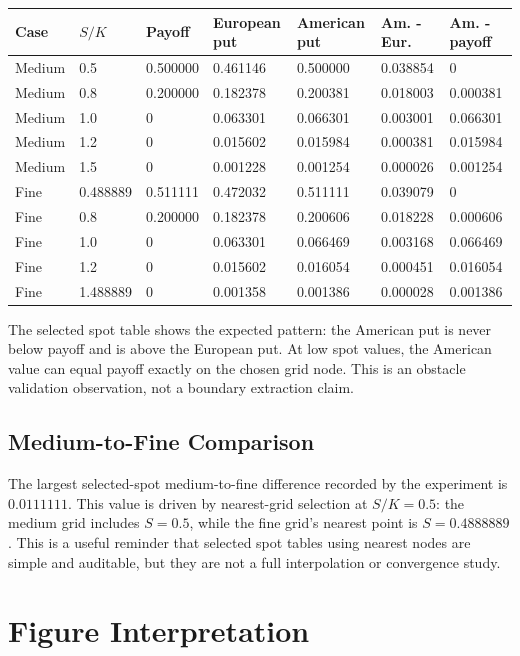 \documentclass[11pt,a4paper]{article}
\begin{document}
{\footnotesize
\begin{longtable}{@{}L{0.10\textwidth}L{0.10\textwidth}L{0.12\textwidth}L{0.13\textwidth}L{0.13\textwidth}L{0.13\textwidth}L{0.13\textwidth}@{}}
\toprule
Case & \(S/K\) & Payoff & European put & American put & Am. - Eur. & Am. - payoff \\
\midrule
\endhead
Medium & 0.5 & 0.500000 & 0.461146 & 0.500000 & 0.038854 & 0 \\
Medium & 0.8 & 0.200000 & 0.182378 & 0.200381 & 0.018003 & 0.000381 \\
Medium & 1.0 & 0 & 0.063301 & 0.066301 & 0.003001 & 0.066301 \\
Medium & 1.2 & 0 & 0.015602 & 0.015984 & 0.000381 & 0.015984 \\
Medium & 1.5 & 0 & 0.001228 & 0.001254 & 0.000026 & 0.001254 \\
Fine & 0.488889 & 0.511111 & 0.472032 & 0.511111 & 0.039079 & 0 \\
Fine & 0.8 & 0.200000 & 0.182378 & 0.200606 & 0.018228 & 0.000606 \\
Fine & 1.0 & 0 & 0.063301 & 0.066469 & 0.003168 & 0.066469 \\
Fine & 1.2 & 0 & 0.015602 & 0.016054 & 0.000451 & 0.016054 \\
Fine & 1.488889 & 0 & 0.001358 & 0.001386 & 0.000028 & 0.001386 \\
\bottomrule
\end{longtable}
}

The selected spot table shows the expected pattern: the American put is never below payoff and is
above the European put. At low spot values, the American value can equal payoff exactly on the
chosen grid node. This is an obstacle validation observation, not a boundary extraction claim.

\subsection{Medium-to-Fine Comparison}

The largest selected-spot medium-to-fine difference recorded by the experiment is \(0.0111111\).
This value is driven by nearest-grid selection at \(S/K=0.5\): the medium grid includes \(S=0.5\),
while the fine grid's nearest point is \(S=0.4888889\). This is a useful reminder that selected
spot tables using nearest nodes are simple and auditable, but they are not a full interpolation or
convergence study.

\section{Figure Interpretation}
\end{document}
